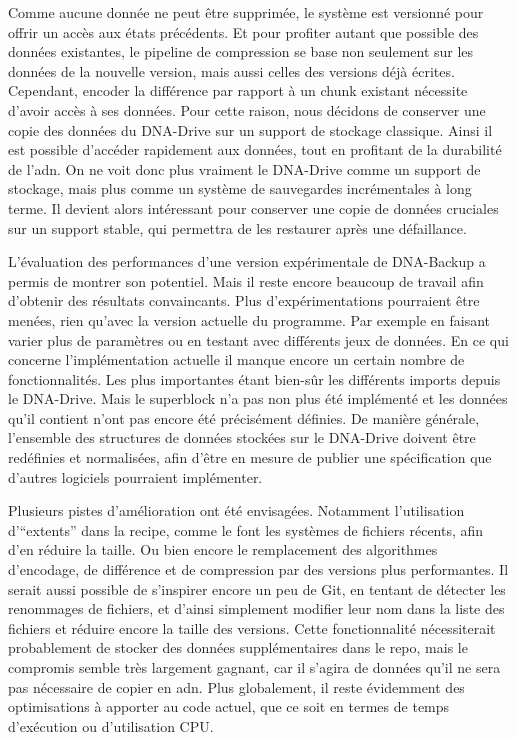 \documentclass[a4paper]{report}
\begin{document}
Comme aucune donnée ne peut être supprimée,
le système est versionné pour offrir un accès aux états précédents.
Et pour profiter autant que possible des données existantes,
le pipeline de compression se base non seulement sur les données de la nouvelle version,
mais aussi celles des versions déjà écrites.
Cependant, encoder la différence par rapport à un chunk existant
nécessite d'avoir accès à ses données.
Pour cette raison, nous décidons de conserver une copie des données du DNA-Drive
sur un support de stockage classique.
Ainsi il est possible d'accéder rapidement aux données,
tout en profitant de la durabilité de l'\ac{adn}.
On ne voit donc plus vraiment le DNA-Drive comme un support de stockage,
mais plus comme un système de sauvegardes incrémentales à long terme.
Il devient alors intéressant pour conserver une copie de données cruciales sur un support stable,
qui permettra de les restaurer après une défaillance.

L'évaluation des performances d'une version expérimentale de DNA-Backup
a permis de montrer son potentiel.
Mais il reste encore beaucoup de travail afin d'obtenir des résultats convaincants.
Plus d'expérimentations pourraient être menées, rien qu'avec la version actuelle du programme.
Par exemple en faisant varier plus de paramètres ou en testant avec différents jeux de données.
En ce qui concerne l'implémentation actuelle il manque encore un certain nombre de fonctionnalités.
Les plus importantes étant bien-sûr les différents imports depuis le DNA-Drive.
Mais le superblock n'a pas non plus été implémenté
et les données qu'il contient n'ont pas encore été précisément définies.
De manière générale, l'ensemble des structures de données stockées
sur le DNA-Drive doivent être redéfinies et normalisées,
afin d'être en mesure de publier une spécification
que d'autres logiciels pourraient implémenter.

Plusieurs pistes d'amélioration ont été envisagées.
Notamment l'utilisation d'``extents'' dans la recipe,
comme le font les systèmes de fichiers récents, afin d'en réduire la taille.
Ou bien encore le remplacement des algorithmes d'encodage,
de différence et de compression par des versions plus performantes.
Il serait aussi possible de s'inspirer encore un peu de Git,
en tentant de détecter les renommages de fichiers,
et d'ainsi simplement modifier leur nom dans la liste des fichiers
et réduire encore la taille des versions.
Cette fonctionnalité nécessiterait probablement
de stocker des données supplémentaires dans le repo,
mais le compromis semble très largement gagnant,
car il s'agira de données qu'il ne sera pas nécessaire de copier en \ac{adn}.
Plus globalement, il reste évidemment des optimisations à apporter au code actuel,
que ce soit en termes de temps d'exécution ou d'utilisation CPU.
\end{document}
